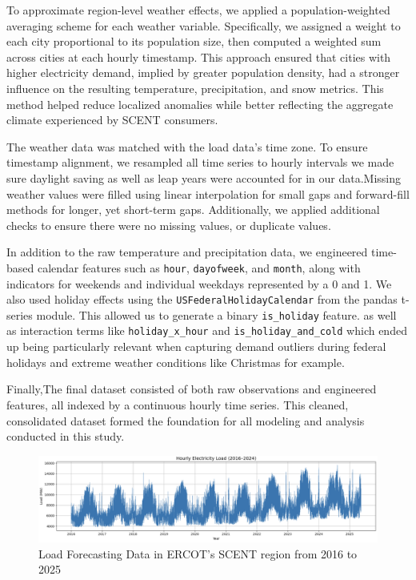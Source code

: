 \documentclass{ifacconf}
\begin{document}
To approximate region-level weather effects, we applied a population-weighted averaging scheme for each weather variable. Specifically, we assigned a weight to each city proportional to its population size, then computed a weighted sum across cities at each hourly timestamp. This approach ensured that cities with higher electricity demand, implied by greater population density, had a stronger influence on the resulting temperature, precipitation, and snow metrics. This method helped reduce localized anomalies while better reflecting the aggregate climate experienced by SCENT consumers.

The weather data was matched with the load data’s time zone. To ensure timestamp alignment, we resampled all time series to hourly intervals we made sure daylight saving as well as leap years were accounted for in our data.Missing weather values were filled using linear interpolation for small gaps and forward-fill methods for longer, yet short-term gaps. Additionally, we applied additional checks to ensure there were no missing values, or duplicate values.

In addition to the raw temperature and precipitation data, we engineered time-based calendar features such as \texttt{hour}, \texttt{dayofweek}, and \texttt{month}, along with  indicators for weekends and individual weekdays represented by a 0 and 1. We also used holiday effects using the \texttt{USFederalHolidayCalendar} from the pandas t-series module. This allowed us to generate a binary \texttt{is_holiday} feature. as well as interaction terms like \texttt{holiday_x_hour} and \texttt{is_holiday_and_cold} which ended up being particularly relevant when capturing demand outliers during federal holidays and extreme weather conditions like Christmas for example.

Finally,The final dataset consisted of both raw observations and engineered features, all indexed by a continuous hourly time series. This cleaned, consolidated dataset formed the foundation for all modeling and analysis conducted in this study.




\begin{figure}[htbp]
    \centering
    \includegraphics[width=0.9\linewidth]{hourly.png} 
    \caption{Load Forecasting Data in ERCOT's SCENT region from 2016 to 2025}
    \label{fig:load_patterns}
\end{figure}
\end{document}

